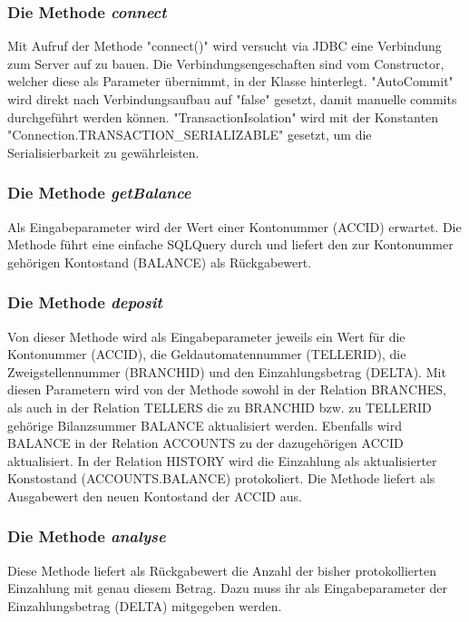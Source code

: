 		\subsubsection{Die Methode \emph{connect}}
 		Mit Aufruf der Methode "connect()" wird versucht via JDBC eine Verbindung zum Server auf zu bauen. Die Verbindungsengeschaften sind vom Constructor, welcher diese als Parameter übernimmt, in der Klasse hinterlegt.
		"AutoCommit" wird direkt nach Verbindungsaufbau auf "false" gesetzt, damit manuelle commits durchgeführt werden können.
		"TransactionIsolation" wird mit der Konstanten "Connection.TRANSACTION\_SERIALIZABLE" gesetzt, um die Serialisierbarkeit zu gewährleisten.

		\subsubsection{Die Methode \emph{getBalance}}
		Als Eingabeparameter wird der Wert einer Kontonummer (ACCID) erwartet. Die Methode führt eine einfache SQLQuery durch und liefert den zur Kontonummer gehörigen Kontostand (BALANCE) als Rückgabewert.

		\subsubsection{Die Methode \emph{deposit}}
		Von dieser Methode wird als Eingabeparameter jeweils ein Wert für die Kontonummer (ACCID), die Geldautomatennummer (TELLERID), die Zweigstellennummer (BRANCHID) und den Einzahlungsbetrag (DELTA).
		Mit diesen Parametern wird von der Methode sowohl in der Relation BRANCHES, als auch in der Relation TELLERS die zu BRANCHID bzw. zu TELLERID gehörige Bilanzsummer BALANCE aktualisiert werden. Ebenfalls wird BALANCE in der Relation ACCOUNTS zu der dazugehörigen ACCID aktualisiert.
		In der Relation HISTORY wird die Einzahlung als aktualisierter Konstostand (ACCOUNTS.BALANCE) protokoliert.
		Die Methode liefert als Ausgabewert den neuen Kontostand der ACCID aus.
		
		\subsubsection{Die Methode \emph{analyse}}
		Diese Methode liefert als Rückgabewert die Anzahl der bisher protokollierten Einzahlung mit genau diesem Betrag.
		Dazu muss ihr als Eingabeparameter der Einzahlungsbetrag (DELTA) mitgegeben werden.

